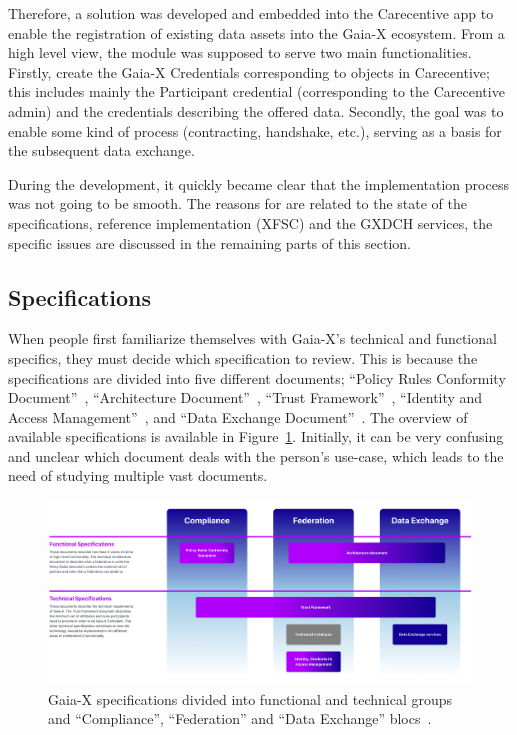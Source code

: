 Therefore, a solution was developed and embedded into the Carecentive app to enable the registration of existing data assets into the Gaia-X ecosystem.
From a high level view, the module was supposed to serve two main functionalities.
Firstly, create the Gaia-X Credentials corresponding to objects in Carecentive; this includes mainly the Participant credential (corresponding to the Carecentive admin) and the credentials describing the offered data.
Secondly, the goal was to enable some kind of process (contracting, handshake, etc.), serving as a basis for the subsequent data exchange.

During the development, it quickly became clear that the implementation process was not going to be smooth.
The reasons for are related to the state of the specifications, reference implementation (XFSC) and the GXDCH services, the specific issues are discussed in the remaining parts of this section.

\subsection{Specifications}\label{subsec:specifications}

When people first familiarize themselves with Gaia-X's technical and functional specifics, they must decide which specification to review.
This is because the specifications are divided into five different documents; ``Policy Rules Conformity Document''~\cite{gaiax_policy_rules}, ``Architecture Document''~\cite{gaiax_architecture_document}, ``Trust Framework''~\cite{gaiax_trust_framework}, ``Identity and Access Management''~\cite{gaiax_identity_and_access_management}, and ``Data Exchange Document''~\cite{gaiax_data_exchange_document}.
The overview of available specifications is available in Figure~\ref{fig:specifications}.
Initially, it can be very confusing and unclear which document deals with the person's use-case, which leads to the need of studying multiple vast documents.

\begin{figure}
    \centering
    \includegraphics[width=\textwidth]{figures/specifications.png}
    \caption{Gaia-X specifications divided into functional and technical groups and ``Compliance'', ``Federation'' and ``Data Exchange'' blocs~\cite{gaiax}.}\label{fig:specifications}
\end{figure}

